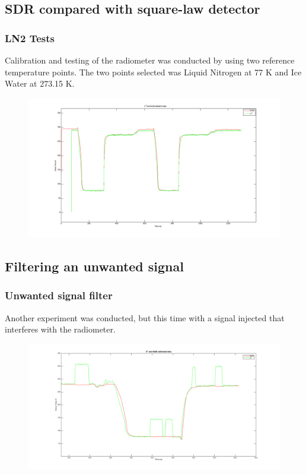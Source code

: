 \documentclass[notes]{beamer}
\begin{document}
\subsection{SDR compared with square-law detector}
\begin{frame}
\frametitle{LN2 Tests}
Calibration and testing of the radiometer was conducted by using two reference temperature points.  The two points selected was Liquid Nitrogen at 77 K and Ice Water at 273.15 K. 

\begin{figure}\label{LN2_stability}
\includegraphics[width=1.0\linewidth]{images/lab1_both_calib.png}
\end{figure} 
\end{frame}
\subsection{Filtering an unwanted signal}
\begin{frame}
\frametitle{Unwanted signal filter}
Another experiment was conducted, but this time with a signal injected that interferes with the radiometer.
\begin{figure}\label{filter_signal}
\includegraphics[width=1.0\linewidth]{images/moneyshot.png}
\end{figure} 
\end{frame}
\end{document}
